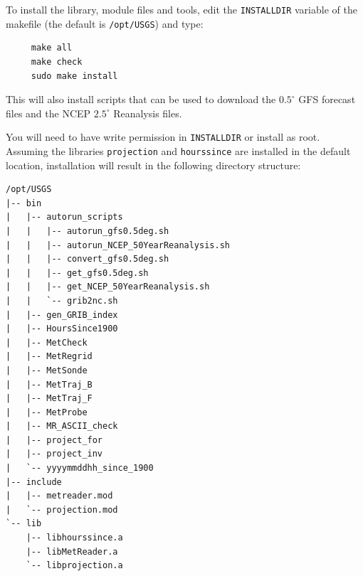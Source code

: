 \documentclass[11pt]{article}   %
\begin{document}
To install the library, module files and tools, edit the \texttt{INSTALLDIR} variable of
the makefile (the default is \texttt{/opt/USGS}) and type:
\begin{verbatim}
     make all
     make check
     sudo make install
\end{verbatim}
This will also install scripts that can be used to download the $0.5^{\circ}$ GFS
forecast files and the NCEP $2.5^{\circ}$ Reanalysis files.

You will need to have write permission in \texttt{INSTALLDIR}
or install as root.  Assuming the libraries \texttt{projection} and \texttt{hourssince} are
installed in the default location, installation will result in the following
directory structure:
\begin{verbatim}
/opt/USGS
|-- bin
|   |-- autorun_scripts
|   |   |-- autorun_gfs0.5deg.sh
|   |   |-- autorun_NCEP_50YearReanalysis.sh
|   |   |-- convert_gfs0.5deg.sh
|   |   |-- get_gfs0.5deg.sh
|   |   |-- get_NCEP_50YearReanalysis.sh
|   |   `-- grib2nc.sh
|   |-- gen_GRIB_index
|   |-- HoursSince1900
|   |-- MetCheck
|   |-- MetRegrid
|   |-- MetSonde
|   |-- MetTraj_B
|   |-- MetTraj_F
|   |-- MetProbe
|   |-- MR_ASCII_check
|   |-- project_for
|   |-- project_inv
|   `-- yyyymmddhh_since_1900
|-- include
|   |-- metreader.mod
|   `-- projection.mod
`-- lib
    |-- libhourssince.a
    |-- libMetReader.a
    `-- libprojection.a
\end{verbatim}
\end{document}
